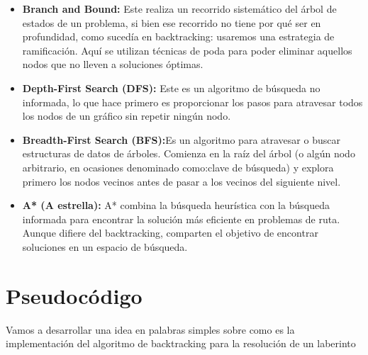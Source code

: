 \documentclass[a4paper,12pt]{article}
\begin{document}
\begin{itemize}
    \item \textbf{Branch and Bound:} Este realiza un recorrido sistemático del árbol de 
    estados de un problema, si bien ese recorrido no tiene por qué ser en profundidad, 
    como sucedía en backtracking: usaremos una estrategia de ramificación. 
    Aquí se utilizan técnicas de poda para poder eliminar aquellos nodos que no 
    lleven a soluciones óptimas.
    
    \item \textbf{Depth-First Search (DFS):} Este es un algoritmo de búsqueda no 
    informada, lo que hace primero es proporcionar los pasos para atravesar todos los 
    nodos de un gráfico sin repetir ningún nodo.
    
    \item \textbf{Breadth-First Search (BFS):}Es un algoritmo para atravesar o buscar 
    estructuras de datos de árboles. Comienza en la raíz del árbol (o algún nodo 
    arbitrario, en ocasiones denominado como:clave de búsqueda) y explora primero 
    los nodos vecinos antes de pasar a los vecinos del siguiente nivel.
    
    \item \textbf{A* (A estrella):} A* combina la búsqueda heurística con la búsqueda 
    informada para encontrar la solución más eficiente en problemas de ruta. Aunque 
    difiere del backtracking, comparten el objetivo de encontrar soluciones en un 
    espacio de búsqueda.
\end{itemize}



\section{Pseudocódigo}
Vamos a desarrollar una idea en palabras simples sobre como es la implementación 
del algoritmo de backtracking para la resolución de un laberinto
\end{document}
